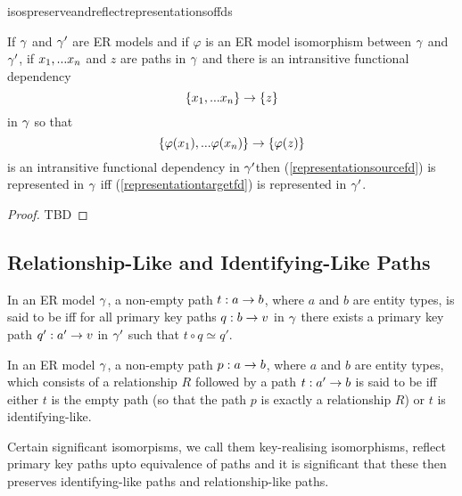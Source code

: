isospreserveandreflectrepresentationsoffds
\begin{lemma}
\label{isospreserveandreflectrepresentationsoffds}
If $\gamma$ and $\gamma'$ are ER models and  if  $\varphi$ is an ER model isomorphism between $\gamma$  and $\gamma'$,  if $x_1,...x_n$ and $z$ are paths in $\gamma$
and there is an  intransitive functional dependency
\begin{equation}
\label{representationsourcefd}
\left\{x_1,...x_n\right\} \rightarrow \left\{z\right\}
\end{equation} 
in $\gamma$
so that
\begin{equation}
\label{representationtargetfd}
\left\{\varphi(x_1),...\varphi(x_n)\right\} \rightarrow \left\{\varphi(z)\right\}
\end{equation}
is an intransitive  functional dependency in $\gamma'$then
(\ref{representationsourcefd}) is represented in $\gamma$ iff
(\ref{representationtargetfd}) is represented in $\gamma'$.
\end{lemma}
\begin{proof}
TBD
\end{proof}

\subsection{Relationship-Like and Identifying-Like Paths}

\begin{definition}
In an ER model $\gamma$, a non-empty path $t: a \rightarrow b$, where $a$ and $b$ are entity types, is said to be  iff  for all primary key paths $q:b \rightarrow v$ in $\gamma$ there exists a primary key path $q':a' \rightarrow v$ in $\gamma'$ such that $t \circ q \simeq q'$.
\end{definition}

\begin{definition}
In an ER model $\gamma$, a non-empty path $p: a \rightarrow b$, where $a$ and $b$ are entity types, which consists
of a relationship $R$ followed by a  path $t :a' \rightarrow b$ is said to be  iff
either  $t$ is the empty path (so that the path $p$ is exactly a relationship $R$) or $t$
is identifying-like.
\end{definition}

Certain significant isomorpisms, we call them key-realising isomorphisms, reflect primary key paths upto equivalence of paths and it is significant that these then preserves identifying-like paths and  relationship-like paths. 

